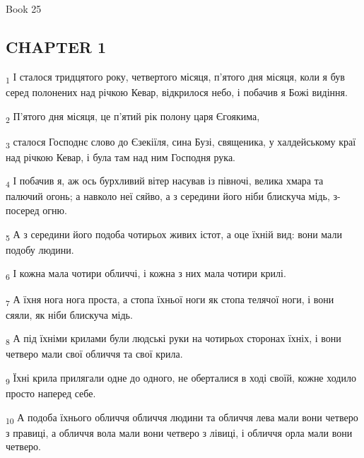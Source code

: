 Book 25
\subsection{CHAPTER 1}
\begin{tcolorbox}
\textsubscript{1} І сталося тридцятого року, четвертого місяця, п'ятого дня місяця, коли я був серед полонених над річкою Кевар, відкрилося небо, і побачив я Божі видіння.
\end{tcolorbox}
\begin{tcolorbox}
\textsubscript{2} П'ятого дня місяця, це п'ятий рік полону царя Єгоякима,
\end{tcolorbox}
\begin{tcolorbox}
\textsubscript{3} сталося Господнє слово до Єзекіїля, сина Бузі, священика, у халдейському краї над річкою Кевар, і була там над ним Господня рука.
\end{tcolorbox}
\begin{tcolorbox}
\textsubscript{4} І побачив я, аж ось бурхливий вітер насував із півночі, велика хмара та палючий огонь; а навколо неї сяйво, а з середини його ніби блискуча мідь, з-посеред огню.
\end{tcolorbox}
\begin{tcolorbox}
\textsubscript{5} А з середини його подоба чотирьох живих істот, а оце їхній вид: вони мали подобу людини.
\end{tcolorbox}
\begin{tcolorbox}
\textsubscript{6} І кожна мала чотири обличчі, і кожна з них мала чотири крилі.
\end{tcolorbox}
\begin{tcolorbox}
\textsubscript{7} А їхня нога нога проста, а стопа їхньої ноги як стопа телячої ноги, і вони сяяли, як ніби блискуча мідь.
\end{tcolorbox}
\begin{tcolorbox}
\textsubscript{8} А під їхніми крилами були людські руки на чотирьох сторонах їхніх, і вони четверо мали свої обличчя та свої крила.
\end{tcolorbox}
\begin{tcolorbox}
\textsubscript{9} Їхні крила прилягали одне до одного, не оберталися в ході своїй, кожне ходило просто наперед себе.
\end{tcolorbox}
\begin{tcolorbox}
\textsubscript{10} А подоба їхнього обличчя обличчя людини та обличчя лева мали вони четверо з правиці, а обличчя вола мали вони четверо з лівиці, і обличчя орла мали вони четверо.
\end{tcolorbox}
